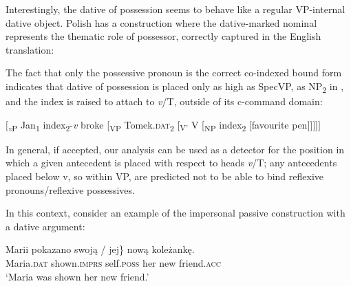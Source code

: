 \documentclass[output=paper,modfonts,nonflat
]{langsci/langscibook}
\begin{document}
\noindent Interestingly, the dative of possession seems to behave like a regular VP-internal dative object. Polish has a construction where the dative-marked nominal represents the thematic role of possessor, correctly captured in the English translation:

\ea \label{ex:witkos:30}
	\z
\z
                        
\noindent The fact that only the possessive pronoun is the correct co-indexed bound form indicates that dative of possession is placed only as high as SpecVP, as NP\textsubscript{2} in , and the index is raised to attach to \textit{v}/T, outside of its c-command domain:

\ea \label{ex:witkos:31}
$[$\textsubscript{\textit{v}P} Jan\textsubscript{1} index\textsubscript{2}-\textit{v} broke [\textsubscript{VP} Tomek.\textsc{dat}\textsubscript{2} [\textsubscript{V$’$} V [\textsubscript{NP} index\textsubscript{2} [favourite pen$]]]]]$\\
\z

\noindent In general, if accepted, our analysis can be used as a detector for the position in which a given antecedent is placed with respect to heads \textit{v}/T; any antecedents placed below v, so within VP, are predicted not to be able to bind reflexive pronouns/reflexive possessives. 

In this context, consider an example of the impersonal passive construction with a dative argument:


\ea \label{ex:witkos:32}
\gll Marii pokazano \minsp{\{*} swoją / jej\} nową koleżankę.\\
     Maria.\textsc{dat} shown.\textsc{imprs} {} self.\textsc{poss} {} her new friend.\textsc{acc}\\
\glt `Maria was shown her new friend.'
\z
                
\end{document}
